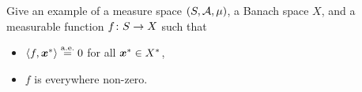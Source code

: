 \begin{exercise}
  Give an example of a measure space $(S, \mathcal{A}, \mu)$, a Banach space $X$, and a measurable function $f \colon S \rightarrow X$ such that
  \begin{itemize}
  \item $\langle f, \bm{x}^* \rangle \stackrel{\mathrm{a.e.}}{=} 0$ for all $\bm{x}^* \in X^*$,
  \item $f$ is everywhere non-zero.
  \end{itemize}
\end{exercise}


